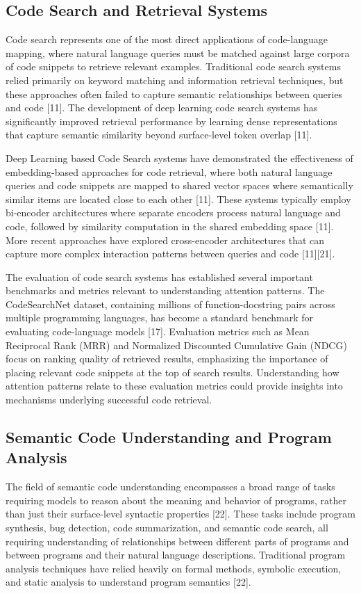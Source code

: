 \documentclass[conference]{IEEEtran}
\begin{document}
\subsection{Code Search and Retrieval Systems}
Code search represents one of the most direct applications of code-language mapping, where natural language queries must be matched against large corpora of code snippets to retrieve relevant examples. Traditional code search systems relied primarily on keyword matching and information retrieval techniques, but these approaches often failed to capture semantic relationships between queries and code [11]. The development of deep learning code search systems has significantly improved retrieval performance by learning dense representations that capture semantic similarity beyond surface-level token overlap [11].

Deep Learning based Code Search systems have demonstrated the effectiveness of embedding-based approaches for code retrieval, where both natural language queries and code snippets are mapped to shared vector spaces where semantically similar items are located close to each other [11]. These systems typically employ bi-encoder architectures where separate encoders process natural language and code, followed by similarity computation in the shared embedding space [11]. More recent approaches have explored cross-encoder architectures that can capture more complex interaction patterns between queries and code [11][21].

The evaluation of code search systems has established several important benchmarks and metrics relevant to understanding attention patterns. The CodeSearchNet dataset, containing millions of function-docstring pairs across multiple programming languages, has become a standard benchmark for evaluating code-language models [17]. Evaluation metrics such as Mean Reciprocal Rank (MRR) and Normalized Discounted Cumulative Gain (NDCG) focus on ranking quality of retrieved results, emphasizing the importance of placing relevant code snippets at the top of search results. Understanding how attention patterns relate to these evaluation metrics could provide insights into mechanisms underlying successful code retrieval.

\subsection{Semantic Code Understanding and Program Analysis
}
The field of semantic code understanding encompasses a broad range of tasks requiring models to reason about the meaning and behavior of programs, rather than just their surface-level syntactic properties [22]. These tasks include program synthesis, bug detection, code summarization, and semantic code search, all requiring understanding of relationships between different parts of programs and between programs and their natural language descriptions. Traditional program analysis techniques have relied heavily on formal methods, symbolic execution, and static analysis to understand program semantics [22].
\end{document}
